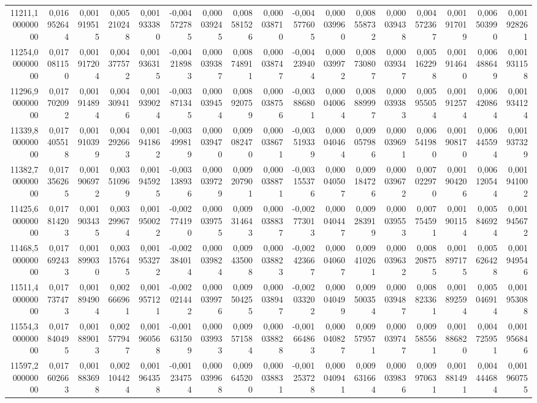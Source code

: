 \begin{longtable}{rrrrrrrrrrrrrrrrr}
11211,100000000 & 0,016952644 & 0,001919515 & 0,005210248 & 0,001933380 & -0,004572785 & 0,000039245 & 0,008581526 & 0,000038710 & -0,004577605 & 0,000039960 & 0,008558732 & 0,000039438 & 0,004572367 & 0,001917019 & 0,006503990 & 0,001928261\\
11254,000000000 & 0,017081150 & 0,001917204 & 0,004377572 & 0,001936315 & -0,004218983 & 0,000039387 & 0,008748911 & 0,000038747 & -0,004239404 & 0,000039972 & 0,008730807 & 0,000039347 & 0,005162298 & 0,001914640 & 0,006488649 & 0,001931158\\
11296,900000000 & 0,017702092 & 0,001914894 & 0,004309416 & 0,001939024 & -0,003871345 & 0,000039454 & 0,008920759 & 0,000038756 & -0,003886801 & 0,000040064 & 0,008889997 & 0,000039383 & 0,005955054 & 0,001912574 & 0,006420864 & 0,001934124\\
11339,800000000 & 0,017405518 & 0,001910399 & 0,004292663 & 0,001941862 & -0,003499819 & 0,000039470 & 0,009082470 & 0,000038671 & -0,003519339 & 0,000040464 & 0,009057986 & 0,000039691 & 0,006541980 & 0,001908170 & 0,006445594 & 0,001937329\\
11382,700000000 & 0,017356265 & 0,001906972 & 0,003510969 & 0,001945925 & -0,003138936 & 0,000039729 & 0,009207901 & 0,000038871 & -0,003155376 & 0,000040507 & 0,009184726 & 0,000039672 & 0,007022970 & 0,001904206 & 0,006120544 & 0,001941002\\
11425,600000000 & 0,017814203 & 0,001903435 & 0,003299674 & 0,001950022 & -0,002774190 & 0,000039755 & 0,009314643 & 0,000038837 & -0,002773013 & 0,000040447 & 0,009283919 & 0,000039553 & 0,007754591 & 0,001901154 & 0,005846924 & 0,001945672\\
11468,500000000 & 0,017692433 & 0,001899030 & 0,003157645 & 0,001953272 & -0,002384014 & 0,000039824 & 0,009435008 & 0,000038823 & -0,002423667 & 0,000040607 & 0,009410261 & 0,000039632 & 0,008208755 & 0,001897175 & 0,005626428 & 0,001949546\\
11511,400000000 & 0,017737473 & 0,001894904 & 0,002666961 & 0,001957121 & -0,002021442 & 0,000039976 & 0,009504255 & 0,000038947 & -0,002033202 & 0,000040499 & 0,009500354 & 0,000039487 & 0,008823361 & 0,001892594 & 0,005046914 & 0,001953088\\
11554,300000000 & 0,017840495 & 0,001889013 & 0,002577947 & 0,001960568 & -0,001631509 & 0,000039933 & 0,009571584 & 0,000038828 & -0,001664863 & 0,000040827 & 0,009579571 & 0,000039747 & 0,009585561 & 0,001886820 & 0,004725951 & 0,001956846\\
11597,200000000 & 0,017602663 & 0,001883698 & 0,002104424 & 0,001964358 & -0,001234754 & 0,000039968 & 0,009645200 & 0,000038831 & -0,001253728 & 0,000040941 & 0,009631664 & 0,000039836 & 0,009970631 & 0,001881491 & 0,004444684 & 0,001960755\\

\end{longtable}
